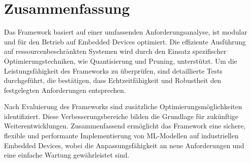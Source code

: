 \section{Zusammenfassung}
Das Framework basiert auf einer umfassenden Anforderungsanalyse, ist modular und für den Betrieb auf Embedded Devices optimiert. Die effiziente Ausführung 
auf ressourcenbeschränkten Systemen wird durch den Einsatz spezifischer Optimierungstechniken, wie Quantisierung und Pruning, unterstützt. Um die Leistungsfähigkeit des Frameworks 
zu überprüfen, sind detaillierte Tests durchgeführt, die bestätigen, dass Echtzeitfähigkeit und Robustheit den festgelegten Anforderungen entsprechen.

Nach Evaluierung des Frameworks sind zusätzliche Optimierungsmöglichkeiten identifiziert. Diese Verbesserungsbereiche bilden die Grundlage für zukünftige Weiterentwicklungen. 
Zusammenfassend ermöglicht das Framework eine sichere, flexible und performante Implementierung von ML-Modellen auf industriellen Embedded Devices, wobei die Anpassungsfähigkeit an 
neue Anforderungen und eine einfache Wartung gewährleistet sind.